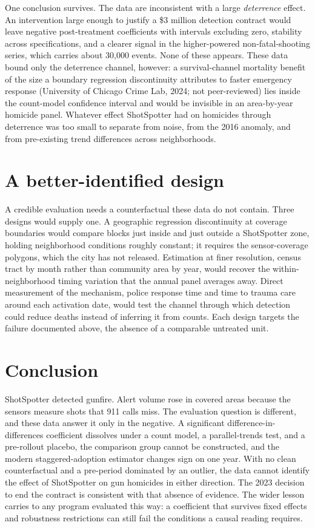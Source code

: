 \documentclass[12pt]{article}
\begin{document}
One conclusion survives. The data are inconsistent with a large \emph{deterrence} effect.
An intervention large enough to justify a \$3 million detection contract would leave
negative post-treatment coefficients with intervals excluding zero, stability across
specifications, and a clearer signal in the higher-powered non-fatal-shooting series,
which carries about 30,000 events. None of these appears. These data bound only the
deterrence channel, however: a survival-channel mortality benefit of the size a boundary
regression discontinuity attributes to faster emergency response (University of Chicago
Crime Lab, 2024; not peer-reviewed) lies inside the count-model confidence interval and
would be invisible in an area-by-year homicide panel. Whatever effect ShotSpotter had on
homicides through deterrence was too small to separate from noise, from the 2016 anomaly,
and from pre-existing trend differences across neighborhoods.

\section{A better-identified design}

A credible evaluation needs a counterfactual these data do not contain. Three designs
would supply one. A geographic regression discontinuity at coverage boundaries would
compare blocks just inside and just outside a ShotSpotter zone, holding neighborhood
conditions roughly constant; it requires the sensor-coverage polygons, which the city has
not released. Estimation at finer resolution, census tract by month rather than community
area by year, would recover the within-neighborhood timing variation that the annual panel
averages away. Direct measurement of the mechanism, police response time and time to
trauma care around each activation date, would test the channel through which detection
could reduce deaths instead of inferring it from counts. Each design targets the failure
documented above, the absence of a comparable untreated unit.

\section{Conclusion}

ShotSpotter detected gunfire. Alert volume rose in covered areas because the sensors
measure shots that 911 calls miss. The evaluation question is different, and these data
answer it only in the negative. A significant difference-in-differences coefficient
dissolves under a count model, a parallel-trends test, and a pre-rollout placebo, the
comparison group cannot be constructed, and the modern staggered-adoption estimator
changes sign on one year. With no clean counterfactual and a pre-period dominated by an
outlier, the data cannot identify the effect of ShotSpotter on gun homicides in either
direction. The 2023 decision to end the contract is consistent with that absence of
evidence. The wider lesson carries to any program evaluated this way: a coefficient that
survives fixed effects and robustness restrictions can still fail the conditions a causal
reading requires.
\end{document}
